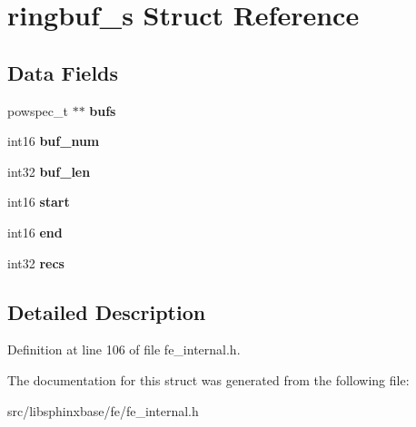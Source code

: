 \section{ringbuf\-\_\-s Struct Reference}
\label{structringbuf__s}
\subsection*{Data Fields}
\begin{DoxyCompactItemize}
\item 
powspec\-\_\-t $\ast$$\ast$ {\bfseries bufs}\label{structringbuf__s_a11a217fc621fe0cb09b74008df26ef24}

\item 
int16 {\bfseries buf\-\_\-num}\label{structringbuf__s_a86c68057bfd5ee118d838dddb2251c08}

\item 
int32 {\bfseries buf\-\_\-len}\label{structringbuf__s_ae7dcac923c44e2c3de82bc53b143be81}

\item 
int16 {\bfseries start}\label{structringbuf__s_a34ff0a330e7157010c31c6769e6ca5f9}

\item 
int16 {\bfseries end}\label{structringbuf__s_a0ae2bcd01e5ca350dacf68186ac99d7c}

\item 
int32 {\bfseries recs}\label{structringbuf__s_a2e2100e3870f3d12fb9d1f0f441b75ee}

\end{DoxyCompactItemize}


\subsection{Detailed Description}


Definition at line 106 of file fe\-\_\-internal.\-h.



The documentation for this struct was generated from the following file\-:\begin{DoxyCompactItemize}
\item 
src/libsphinxbase/fe/fe\-\_\-internal.\-h\end{DoxyCompactItemize}
